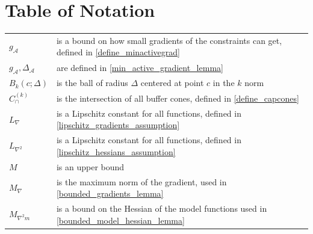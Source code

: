 \documentclass{article}
\theoremstyle{case}
\numberwithin{theorem}{subsection}
\newcommand{\capcones}{{C^{(k)}_{\cap}}}
\newcommand{\lipgrad}{{L_{\nabla}}}
\newcommand{\liphess}{{L_{\nabla^2}}}
\newcommand{\maxgrad}{{M_{\nabla}}}
\newcommand{\maxmodelhessian}{{M_{\nabla^2 m}}}
\newcommand{\minactivegraddelta}{{\Delta_{\mathcal A}}}
\newcommand{\minactivegrad}{{ g_{\mathcal A} }}
\begin{document}
\section{Table of Notation}
\begin{longtable}{| p{} | p{} |}
$\minactivegrad$ & is a bound on how small gradients of the constraints can get, defined in \cref{define_minactivegrad} \\ %
$\minactivegrad, \minactivegraddelta$ & are defined in \cref{min_active_gradient_lemma} \\ %
$B_k(c; \Delta)$ & is the ball of radius $\Delta$ centered at point $c$ in the $k$ norm\\ %
$\capcones$ & is the intersection of all buffer cones, defined in \cref{define_capcones} \\ %
$\lipgrad$ & is a Lipschitz constant for all functions, defined in \cref{lipschitz_gradients_assumption} \\ %
$\liphess$ & is a Lipschitz constant for all functions, defined in \cref{lipschitz_hessians_assumption} \\ %
$M$ & is an upper bound \\ %
$\maxgrad$ & is the maximum norm of the gradient, used in \cref{bounded_gradients_lemma} \\ %
$\maxmodelhessian$ & is a bound on the Hessian of the model functions used in \cref{bounded_model_hessian_lemma} \\ %

\end{longtable}
\end{document}
